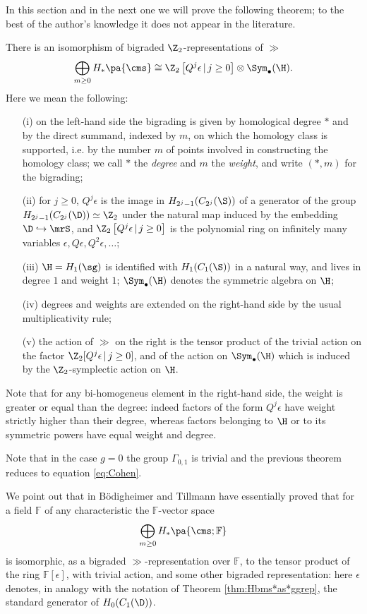 In this section and in the next one we will prove the following theorem; to the best of the author's knowledge
it does not appear in the literature.
\begin{thm}
 \label{thm:Hbms*as*ggrep}
 There is an isomorphism of bigraded $\Z_2$-representations of $\gg$
 \[
  \bigoplus_{m\geq 0} H_*\pa{\cms}\cong \Z_2\left[Q^j\epsilon\,|\, j\geq 0\right]\otimes\Sym_{\bullet}(\H).
 \]
 Here we mean the following:
 \begin{itemize}
  \item[(i)] on the left-hand side the bigrading is given by homological degree $*$ and by the direct summand,
  indexed by $m$,
  on which the homology class is supported, i.e. by the number $m$ of points
  involved in constructing the homology class; we call $*$ the \emph{degree} and $m$ the \emph{weight},
  and write $(*,m)$ for the bigrading;
  \item[(ii)] for $j\geq 0$, $Q^j\epsilon$ is the image in $H_{2^j-1}(C_{2^j}(\S))$ of a generator
  of the group $H_{2^j-1}(C_{2^j}(\D))\simeq \Z_2$ 
  under the natural map induced by the embedding $\D\hookrightarrow\mrS$,
  and $\Z_2\left[Q^j\epsilon\,|\, j\geq 0\right]$ is the polynomial ring on
  infinitely many variables $\epsilon,Q\epsilon,Q^2\epsilon,\dots$;
  \item[(iii)] $\H=H_1(\sg)$ is identified with $H_1(C_1(\S))$ in a natural way, and lives in degree $1$ and weight $1$;
  $\Sym_{\bullet}(\H)$ denotes the symmetric algebra on $\H$;
  \item[(iv)] degrees and weights are extended on the right-hand side by the usual multiplicativity rule;
  \item[(v)] the action of $\gg$ on the right is the tensor product of the trivial action
  on the factor $\Z_2[Q^j\epsilon\,|\, j\geq 0]$, and of the action on
  $\Sym_{\bullet}(\H)$ which is induced by the $\Z_2$-symplectic action on $\H$.
  \end{itemize}
\end{thm}
Note that for any bi-homogeneus element in the right-hand side, the weight is greater or equal than
the degree: indeed factors of the form $Q^j\epsilon$ have weight strictly higher than their degree,
whereas factors belonging to $\H$ or to its symmetric powers have equal weight and degree.
  
Note that in the case $g=0$ the group $\Gamma_{0,1}$ is trivial and the previous theorem
reduces to equation \eqref{eq:Cohen}.

We point out that in \cite{BoT} B\"{o}digheimer and Tillmann have essentially proved that for a field
$\mathbb{F}$ of any characteristic the $\mathbb{F}$-vector space
\[
  \bigoplus_{m\geq 0} H_*\pa{\cms;\mathbb{F}}
\]
is isomorphic, as a bigraded $\gg$-representation over $\mathbb{F}$, to the tensor product
of the ring $\mathbb{F}[\epsilon]$, with trivial action, and some other bigraded representation:
here $\epsilon$ denotes, in analogy with the notation of Theorem \ref{thm:Hbms*as*ggrep}, the standard generator of $H_0(C_1(\D))$.

